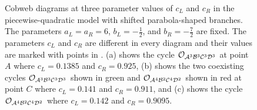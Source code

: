 \begin{figure}
	\centering
	\caption[Cobweb diagrams of the piecewise-quadratic model with shifted parabola-shaped branches]{
		Cobweb diagrams at three parameter values of $c_L$ and $c_R$ in the piecewise-quadratic model with shifted parabola-shaped branches.
		The parameters $a_L = a_R = 6$, $b_L = -\frac{1}{2}$, and $b_R = -\frac{7}{2}$ are fixed.
		The parameters $c_L$ and $c_R$ are different in every diagram and their values are marked with points in .
		(a) shows the cycle $\mathcal{O}_{\mathcal{A}^3\mathcal{B}^3\mathcal{C}^3\mathcal{D}^3}$ at point $A$ where $c_L = 0.1385$ and $c_R = 0.925$,
		(b) shows the two coexisting cycles $\mathcal{O}_{\mathcal{A}^3\mathcal{B}^3\mathcal{C}^3\mathcal{D}^3}$ shown in green and $\mathcal{O}_{\mathcal{A}^4\mathcal{B}^2\mathcal{C}^4\mathcal{D}^2}$ shown in red at point $C$ where $c_L = 0.141$ and $c_R = 0.911$,
		and (c) shows the cycle $\mathcal{O}_{\mathcal{A}^4\mathcal{B}^2\mathcal{C}^4\mathcal{D}^2}$ where $c_L = 0.142$ and $c_R = 0.9095$.
	}
	\label{fig:setup.quad.skew.cobwebs}
\end{figure}


